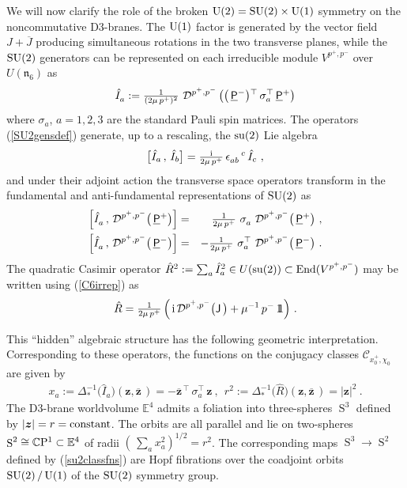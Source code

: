 \documentclass[11pt,a4paper]{article}
\DeclareMathOperator{\Sphere}{S}
\let\S\Sphere
\newcommand{\ii}{{\rm i}}
\newcommand{\mbf}[1]{{\boldsymbol {#1} }}
\def\ii{{\,{\rm i}\,}}
\def\J{{\sf J}}
\def\Pu{\underline{\sf P}{}}
\def\mz{{\mbf z}}
\def\mcDp{{\mathcal D}^{p^+,p^-}}
\newcommand{\complex}{{\mathbb C}} %
\newcommand{\eucl}{{\mathbb E}}
\newcommand{\id}{{1\!\!1}} %
\def\nn{\nonumber}
\def\bea{\begin{eqnarray}}
\def\eea{\end{eqnarray}}
\newcommand{\beq}{\begin{eqnarray}}
\newcommand{\eeq}{\end{eqnarray}}
\begin{document}
We will now clarify the role of the broken ${\rm U}(2)={\rm
  SU}(2)\times{\rm U}(1)$ symmetry on the noncommutative D3-branes. The ${\rm
U}(1)$ factor is generated by the vector
field $J+\overline{J}$ producing simultaneous rotations in the two
transverse planes, while the ${\rm SU}(2)$ generators can be
represented on each irreducible module $V^{p^+,p^-}$ over
$U(\mathfrak{n}_6)$ as
\beq
\hat I^{~}_a:=\mbox{$\frac1{(2\mu\,p^+)^2}$}~
\mcDp\left(\bigl(\,\Pu^-\bigr){}^\top\,
\sigma_a^\top\,\Pu^+\right)
\label{SU2gensdef}\eeq
where $\sigma_a$, $a=1,2,3$ are the standard Pauli spin matrices. The
operators (\ref{SU2gensdef}) generate, up to a rescaling, the ${\rm
  su}(2)$ Lie algebra
\beq
\bigl[\hat I_a\,,\,\hat I_b\bigr]=
\mbox{$\frac\ii{2\mu\,p^+}$}\,\epsilon_{ab}^{~~~c}\,\hat I_c \ ,
\label{su2liealg}\eeq
and under their adjoint action the transverse space operators
transform in the fundamental and anti-fundamental representations of
${\rm SU}(2)$ as
\bea
\left[\hat I^{~}_a\,,\,\mcDp\bigl(\,\Pu^+\bigr)
\right]&=&\mbox{$\frac1{2\mu\,p^+}$}~
\sigma^{~}_a~\mcDp\bigl(\,\Pu^+\bigr) \ , \nn\\
\left[\hat I^{~}_a\,,\,\mcDp\bigl(\,\Pu^-\bigr)
\right]&=&-\mbox{$\frac1{2\mu\,p^+}$}~
\sigma_a^\top~\mcDp\bigl(\,\Pu^-\bigr) \ .
\label{Pfundreps}\eea
The quadratic Casimir operator $\hat R^2:=\sum_a\hat I_a^2\in U({\rm
  su}(2))\subset{\rm End}(V^{p^+,p^-})$ may be written using
(\ref{C6irrep}) as
\beq
\hat R=\mbox{$\frac1{2\mu\,p^+}$}\,\Bigl(\ii\mcDp\bigl(\J\,\bigr)
+\mu^{-1}\,p^-\,\id\Bigr) \ .
\label{su2quadCas}\eeq

This ``hidden'' algebraic structure has the following geometric
interpretation. Corresponding to these operators, the functions on the
conjugacy classes $\mathcal{C}_{x_0^+,\chi^{~}_0}$ are given by
\beq
x_a:=\Delta_*^{-1}\bigl(\hat I^{~}_a\bigr)\left(\mz,
\overline{\mz}\,\right)=-\overline{\mz}{}^{\,\top}
\,\sigma_a^\top\,\mz \ , ~~ r^2:=
\Delta_*^{-1}\bigl(\hat R\bigr)\left(\mz,
\overline{\mz}\,\right)=|\mz|^2 \ .
\label{su2classfns}\eeq
The D3-brane worldvolume $\eucl^4$ admits a foliation into three-spheres
$\S^3$ defined by $|\mz|=r={\rm constant}$. The orbits are all
parallel and lie on two-spheres $\S^2\cong\complex{\rm
  P}^1\subset\eucl^4$ of radii $(\,\sum_ax_a^2)^{1/2}=r^2$. The corresponding
maps
$\S^3\to\S^2$ defined by (\ref{su2classfns}) are Hopf fibrations over
the coadjoint orbits ${\rm SU}(2)\,/\,{\rm U}(1)$ of the ${\rm SU}(2)$
symmetry group.
\end{document}
